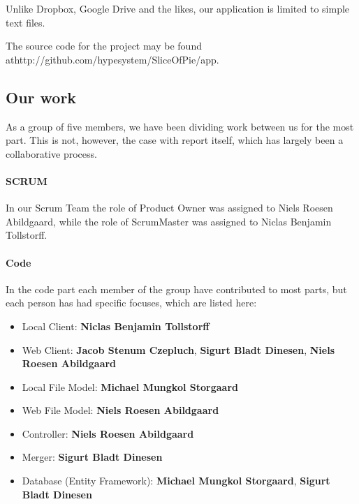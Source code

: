 Unlike Dropbox, Google Drive and the likes, our application is limited to simple text files.

The source code for the project may be found at\newline http://github.com/hypesystem/SliceOfPie/app.

\subsection{Our work}
As a group of five members, we have been dividing work between us for the most part. This is not, however, the case with report itself, which has largely been a collaborative process.

\paragraph{SCRUM}
In our Scrum Team the role of Product Owner was assigned to Niels Roesen Abildgaard, while the role of ScrumMaster was assigned to Niclas Benjamin Tollstorff.

\paragraph{Code}
In the code part each member of the group have contributed to most parts, but each person has had specific focuses, which are listed here:\\

\begin{itemize}
\item Local Client: \textbf{Niclas Benjamin Tollstorff}
\item Web Client: \textbf{Jacob Stenum Czepluch}, \textbf{Sigurt Bladt Dinesen}, \textbf{Niels Roesen Abildgaard}
\item Local File Model: \textbf{Michael Mungkol Storgaard}
\item Web File Model: \textbf{Niels Roesen Abildgaard}
\item Controller: \textbf{Niels Roesen Abildgaard}
\item Merger: \textbf{Sigurt Bladt Dinesen}
\item Database (Entity Framework): \textbf{Michael Mungkol Storgaard}, \textbf{Sigurt Bladt Dinesen}
\end{itemize}
